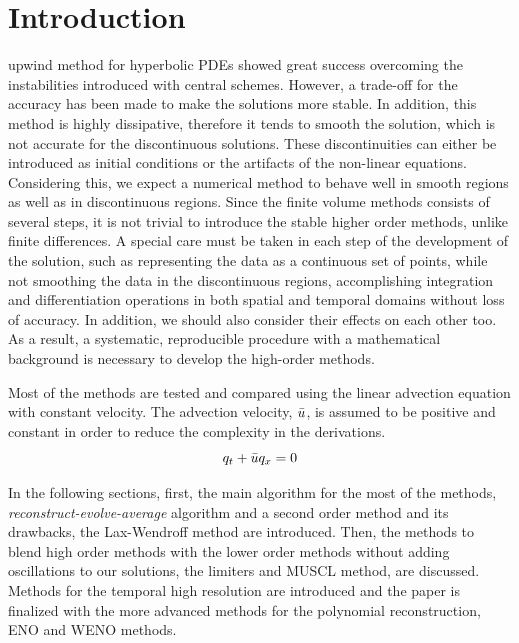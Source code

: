 \documentclass[journal,onecolumn]{IEEEtran}
\begin{document}
\section{Introduction}
% 
% 
% 
% 
 upwind method for hyperbolic PDEs showed great success overcoming the instabilities introduced with central schemes. However, a trade-off for the accuracy has been made to make the solutions more stable. In addition, this method is highly dissipative, therefore it tends to smooth the solution, which is not accurate for the discontinuous solutions. These discontinuities can either be introduced as initial conditions or the artifacts of the non-linear equations. Considering this, we expect a numerical method to behave well in smooth regions as well as in discontinuous regions. Since the finite volume methods consists of several steps, it is not trivial to introduce the stable higher order methods, unlike finite differences. A special care must be taken in each step of the development of the solution, such as representing the data as a continuous set of points, while not smoothing the data in the discontinuous regions, accomplishing integration and differentiation operations in both spatial and temporal domains without loss of accuracy. In addition, we should also consider their effects on each other too. As a result, a systematic, reproducible procedure with a mathematical background is necessary to develop the high-order methods.
\par
Most of the methods are tested and compared using the linear advection equation with constant velocity. The advection velocity, $\Bar{u}$, is assumed to be positive and constant in order to reduce the complexity in the derivations.
\begin{equation} \label{advection}
    q_t + \Bar{u}q_x = 0
\end{equation}
\par
In the following sections, first, the main algorithm for the most of the methods, \textit{reconstruct-evolve-average} algorithm and a second order method and its drawbacks, the Lax-Wendroff method are introduced. Then, the methods to blend high order methods with the lower order methods without adding oscillations to our solutions, the limiters and MUSCL method, are discussed. Methods for the temporal high resolution are introduced and the paper is finalized with the more advanced methods for the polynomial reconstruction, ENO and WENO methods.
\end{document}
